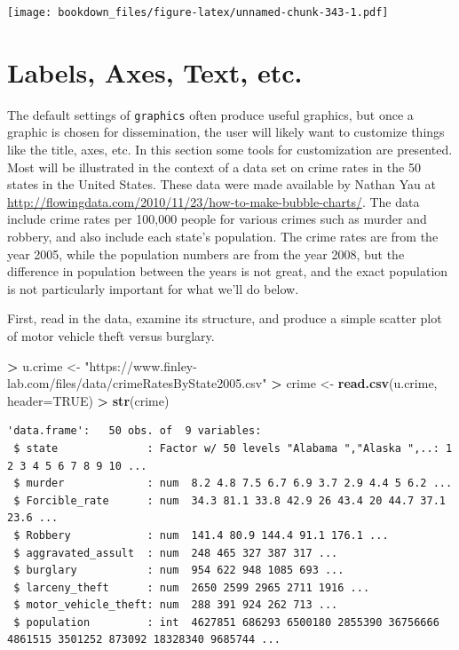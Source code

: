 \documentclass[
]{krantz}
\makeatletter
\newenvironment{Shaded}{\begin{snugshade}}{\end{snugshade}}
\newcommand{\DataTypeTok}[1]{\textcolor[rgb]{0.27,0.27,0.27}{#1}}
\newcommand{\KeywordTok}[1]{\textcolor[rgb]{0.27,0.27,0.27}{\textbf{#1}}}
\newcommand{\NormalTok}[1]{#1}
\newcommand{\OperatorTok}[1]{\textcolor[rgb]{0.43,0.43,0.43}{\textbf{#1}}}
\newcommand{\OtherTok}[1]{\textcolor[rgb]{0.37,0.37,0.37}{#1}}
\newcommand{\StringTok}[1]{\textcolor[rgb]{0.5,0.5,0.5}{#1}}
\newenvironment{kframe}{%
\medskip{}
\setlength{\fboxsep}{.8em}
 \def\at@end@of@kframe{}%
 \ifinner\ifhmode%
  \def\at@end@of@kframe{\end{minipage}}%
  \begin{minipage}{\columnwidth}%
 \fi\fi%
 \def\FrameCommand##1{\hskip\@totalleftmargin \hskip-\fboxsep
 \colorbox{shadecolor}{##1}\hskip-\fboxsep
     \hskip-\linewidth \hskip-\@totalleftmargin \hskip\columnwidth}%
 \MakeFramed {\advance\hsize-\width
   \@totalleftmargin\z@ \linewidth\hsize
   \@setminipage}}%
 {\par\unskip\endMakeFramed%
 \at@end@of@kframe}
\renewenvironment{Shaded}{\begin{kframe}}{\end{kframe}}
\makeatother
\begin{document}
\texttt{[image: bookdown\_files/figure-latex/unnamed-chunk-343-1.pdf]}

\hypertarget{labels-axes-text-etc.-1}{%
\section{Labels, Axes, Text, etc.}\label{labels-axes-text-etc.-1}}

The default settings of \texttt{graphics} often produce useful graphics, but once a graphic is chosen for dissemination, the user will likely want to customize things like the title, axes, etc. In this section some tools for customization are presented. Most will be illustrated in the context of a data set on crime rates in the 50 states in the United States. These data were made available by Nathan Yau at \url{http://flowingdata.com/2010/11/23/how-to-make-bubble-charts/}. The data include crime rates per 100,000 people for various crimes such as murder and robbery, and also include each state's population. The crime rates are from the year 2005, while the population numbers are from the year 2008, but the difference in population between the years is not great, and the exact population is not particularly important for what we'll do below.

First, read in the data, examine its structure, and produce a simple scatter plot of motor vehicle theft versus burglary.

\begin{Shaded}
\begin{Highlighting}[]
\OperatorTok{\textgreater{}}\StringTok{ }\NormalTok{u.crime \textless{}{-}}\StringTok{ "https://www.finley{-}lab.com/files/data/crimeRatesByState2005.csv"}
\OperatorTok{\textgreater{}}\StringTok{ }\NormalTok{crime \textless{}{-}}\StringTok{ }\KeywordTok{read.csv}\NormalTok{(u.crime, }\DataTypeTok{header=}\OtherTok{TRUE}\NormalTok{)}
\OperatorTok{\textgreater{}}\StringTok{ }\KeywordTok{str}\NormalTok{(crime)}
\end{Highlighting}
\end{Shaded}

\begin{verbatim}
'data.frame':   50 obs. of  9 variables:
 $ state              : Factor w/ 50 levels "Alabama ","Alaska ",..: 1 2 3 4 5 6 7 8 9 10 ...
 $ murder             : num  8.2 4.8 7.5 6.7 6.9 3.7 2.9 4.4 5 6.2 ...
 $ Forcible_rate      : num  34.3 81.1 33.8 42.9 26 43.4 20 44.7 37.1 23.6 ...
 $ Robbery            : num  141.4 80.9 144.4 91.1 176.1 ...
 $ aggravated_assult  : num  248 465 327 387 317 ...
 $ burglary           : num  954 622 948 1085 693 ...
 $ larceny_theft      : num  2650 2599 2965 2711 1916 ...
 $ motor_vehicle_theft: num  288 391 924 262 713 ...
 $ population         : int  4627851 686293 6500180 2855390 36756666 4861515 3501252 873092 18328340 9685744 ...
\end{verbatim}
\end{document}
